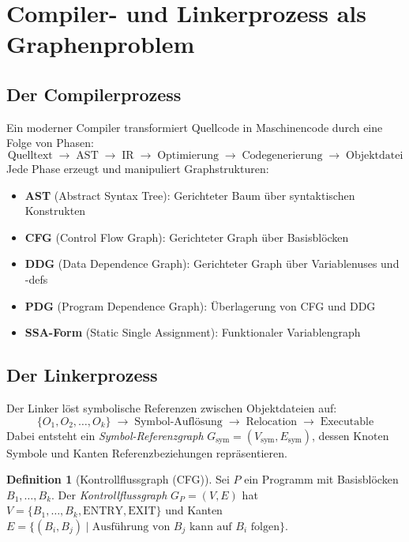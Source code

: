 ﻿\documentclass[a4paper,12pt]{article}
\theoremstyle{definition}
\newtheorem{definition}{Definition}
\begin{document}
\section{Compiler- und Linkerprozess als Graphenproblem}

\subsection{Der Compilerprozess}

Ein moderner Compiler transformiert Quellcode in Maschinencode durch eine Folge von Phasen:
\[
\text{Quelltext} \;\to\; \text{AST} \;\to\; \text{IR} \;\to\; \text{Optimierung} \;\to\; \text{Codegenerierung} \;\to\; \text{Objektdatei}
\]
Jede Phase erzeugt und manipuliert Graphstrukturen:

\begin{itemize}
    \item \textbf{AST} (Abstract Syntax Tree): Gerichteter Baum über syntaktischen Konstrukten
    \item \textbf{CFG} (Control Flow Graph): Gerichteter Graph über Basisblöcken
    \item \textbf{DDG} (Data Dependence Graph): Gerichteter Graph über Variablenuses und -defs
    \item \textbf{PDG} (Program Dependence Graph): Überlagerung von CFG und DDG
    \item \textbf{SSA-Form} (Static Single Assignment): Funktionaler Variablengraph
\end{itemize}

\subsection{Der Linkerprozess}

Der Linker löst symbolische Referenzen zwischen Objektdateien auf:
\[
\{O_1, O_2, \ldots, O_k\} \;\to\; \text{Symbol-Auflösung} \;\to\; \text{Relocation} \;\to\; \text{Executable}
\]
Dabei entsteht ein \emph{Symbol-Referenzgraph} $G_{\text{sym}} = (V_{\text{sym}}, E_{\text{sym}})$, dessen Knoten Symbole und Kanten Referenzbeziehungen repräsentieren.

\begin{definition}[Kontrollflussgraph (CFG)]
\label{def:cfg}
Sei $P$ ein Programm mit Basisblöcken $B_1, \ldots, B_k$. Der \emph{Kontrollflussgraph} $G_P = (V, E)$ hat $V = \{B_1, \ldots, B_k, \text{ENTRY}, \text{EXIT}\}$ und Kanten $E = \{(B_i, B_j) \mid \text{Ausführung von } B_j \text{ kann auf } B_i \text{ folgen}\}$.
\end{definition}
\end{document}
